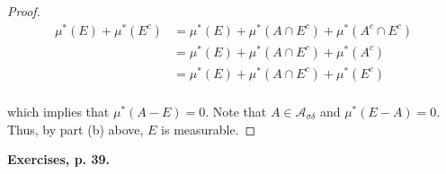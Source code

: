 \documentclass[11pt,oneside,english]{amsart}
\theoremstyle{definition}
\newcommand{\MC}[1]{\mathcal{#1}}
\begin{document}
\begin{enumerate}
\begin{proof}
\begin{align*}
\mu^*(E)+\mu^*(E^c)&=\mu^*(E)+\mu^*(A \cap E^c)+\mu^*(A^c \cap E^c)\\[2mm]
&=\mu^*(E)+\mu^*(A \cap E^c)+\mu^*(A^c)\\[2mm]
&=\mu^*(E)+\mu^*(A \cap E^c)+\mu^*(E^c)\\[2mm]
\end{align*}

which implies that $\mu^*(A-E)=0$. Note that $A\in\MC{A}_{\sigma\delta}$ and $\mu^*(E-A)=0$. Thus, by part (b) above, $E$ is measurable.






\end{proof}

\end{enumerate}



\textbf{Exercises, p. 39.}
\end{document}
